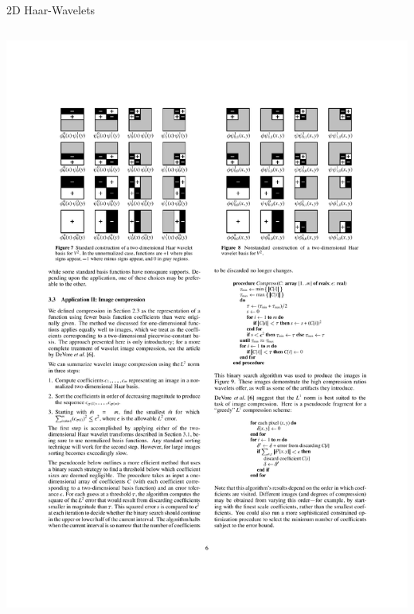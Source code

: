 {\begin{frame}{2D Haar-Wavelets}
\begin{columns}[T, onlytextwidth]
			\includegraphics[trim=325 545 79 100, clip, width=\textwidth]{2d_wavelets.pdf}
		\end{columns}
	\end{frame}}

